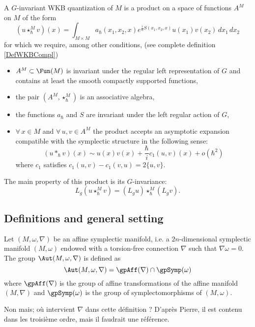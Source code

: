 A $G$-invariant WKB quantization of $M$ is a product on a space of functions $A^{M}$ on $M$ of the form
\[ 
  (u\star^M_{\hbar}v)(x)=\int_{M\times M} a_{\hbar}(x_1,x_2,x) e^{\frac{ i }{ \hbar }S(x_1,x_2,x)} u(x_1)v(x_2)\,dx_1\,dx_2
\]
for which we require, among other conditions, (see complete definition \ref{DefWKBCompl}) 
\begin{itemize}
\item $A^M\subset \Fun(M)$ is invariant under the regular left representation of $G$ and contains at least the smooth compactly supported functions,
\item the pair $(A^M,\star^M_{\hbar})$ is an associative algebra,
\item the functions $a_{\hbar}$ and $S$ are invariant under the left regular action of $G$,
\item $\forall\, x\in M$ and $\forall\,u,v\in A^M$ the product accepts an asymptotic expansion compatible with the symplectic structure in the following sense:
\[ 
  (u\ast_{\hbar} v)(x)\sim u(x)v(x)+\frac{ \hbar }{ i }c_{1}(u,v)(x)+o(\hbar^{2})
\]
where $c_{1}$ satisfies $c_{1}(u,v)-c_{1}(v,u)=2\{ u,v \}$.
\end{itemize}
The main property of this product is its $G$-invariance:
\[ 
  L_g(u\star^M_{\hbar}v)=(L_gu)\star^M_{\hbar}(L_gv).
\]

\subsection{Definitions and general setting}

Let $(M,\omega,\nabla)$ be an affine symplectic manifold, i.e. a $2n$-dimensional symplectic manifold $(M,\omega)$ endowed with a torsion-free connection $\nabla$ such that $\nabla\omega=0$. The  group $\Aut(M,\omega,\nabla)$ is defined as
\[ 
  \Aut(M,\omega,\nabla)=\gpAff(\nabla)\cap\gpSymp(\omega)
\]
where $\gpAff(\nabla)$ is the group of affine transformations of the affine manifold $(M,\nabla)$ and $\gpSymp(\omega)$ is the group of symplectomorphisms of $(M,\omega)$.


\begin{probleme}
Non mais; où intervient $\nabla$ dans cette définition ? D'après Pierre, il est contenu dans les troisième ordre, mais il faudrait une référence.
\label{ProbNablades}
\end{probleme}

